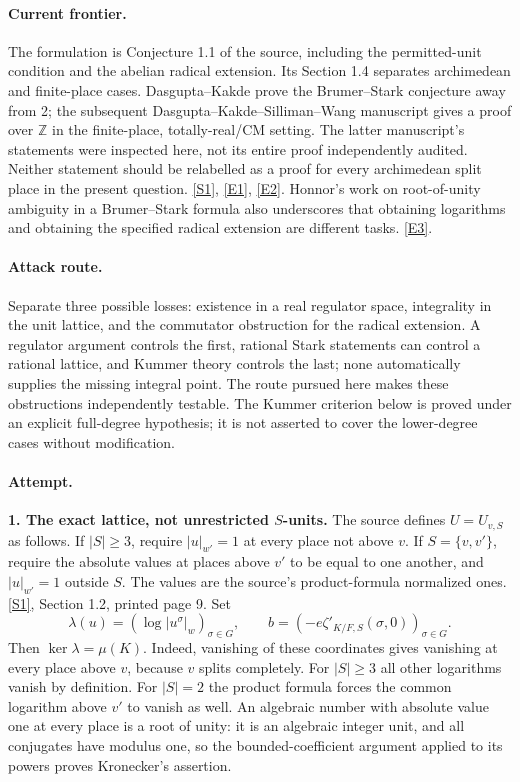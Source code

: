 \documentclass[11pt,a4paper]{article}
\newcommand{\Z}{\mathbb{Z}}
\newcommand{\sref}[2]{\hyperlink{source:#1:#2}{[S#2]}}
\newcommand{\eref}[2]{\hyperlink{extra:#1:#2}{[E#2]}}
\numberwithin{equation}{section}
\begin{document}
\paragraph{Current frontier.}
The formulation is Conjecture 1.1 of the source, including the permitted-unit
condition and the abelian radical extension. Its Section 1.4 separates
archimedean and finite-place cases. Dasgupta--Kakde prove the Brumer--Stark
conjecture away from 2; the subsequent Dasgupta--Kakde--Silliman--Wang
manuscript gives a proof over $\Z$ in the finite-place, totally-real/CM
setting. The latter manuscript's statements were inspected here, not its
entire proof independently audited. Neither statement should be relabelled
as a proof for every archimedean split place in the present question.
\sref{statement}{1}, \eref{statement}{1}, \eref{statement}{2}.
Honnor's work on root-of-unity ambiguity in a Brumer--Stark formula also
underscores that obtaining logarithms and obtaining the specified radical
extension are different tasks. \eref{statement}{3}.

\paragraph{Attack route.}
Separate three possible losses: existence in a real regulator space,
integrality in the unit lattice, and the commutator obstruction for the
radical extension. A regulator argument controls the first, rational Stark
statements can control a rational lattice, and Kummer theory controls the
last; none automatically supplies the missing integral point. The route
pursued here makes these obstructions independently testable. The Kummer
criterion below is proved under an explicit full-degree hypothesis; it is
not asserted to cover the lower-degree cases without modification.

\paragraph{Attempt.}
\textbf{1. The exact lattice, not unrestricted $S$-units.}
The source defines $U=U_{v,S}$ as follows. If $|S|\ge3$, require
$|u|_{w'}=1$ at every place not above $v$. If $S=\{v,v'\}$, require the
absolute values at places above $v'$ to be equal to one another, and
$|u|_{w'}=1$ outside $S$. The values are the source's product-formula
normalized ones. \sref{statement}{1}, Section 1.2, printed page 9.
Set
\begin{equation}\label{eq:statement:lattice}
 \lambda(u)=(\log|u^\sigma|_w)_{\sigma\in G},\qquad
 b=(-e\zeta'_{K/F,S}(\sigma,0))_{\sigma\in G}.
\end{equation}
Then $\ker\lambda=\mu(K)$. Indeed, vanishing of these coordinates gives
vanishing at every place above $v$, because $v$ splits completely.
For $|S|\ge3$ all other logarithms vanish by definition. For $|S|=2$
the product formula forces the common logarithm above $v'$ to vanish as
well. An algebraic number with absolute value one at every place is a
root of unity: it is an algebraic integer unit, and all conjugates have
modulus one, so the bounded-coefficient argument applied to its powers
proves Kronecker's assertion.
\end{document}
